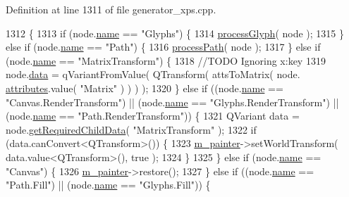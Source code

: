 Definition at line 1311 of file generator\+\_\+xps.\+cpp.


\begin{DoxyCode}
1312 \{
1313     \textcolor{keywordflow}{if} (node.\hyperlink{classXpsRenderNode_a7b3d33b9669c0235e095d5efc870ccf0}{name} == \textcolor{stringliteral}{"Glyphs"}) \{
1314         \hyperlink{classXpsHandler_a04b3024d155c9df20b3843e27014ff2c}{processGlyph}( node );
1315     \} \textcolor{keywordflow}{else} \textcolor{keywordflow}{if} (node.\hyperlink{classXpsRenderNode_a7b3d33b9669c0235e095d5efc870ccf0}{name} == \textcolor{stringliteral}{"Path"}) \{
1316         \hyperlink{classXpsHandler_a7e906e018c5e746d79a0ae796b1734a3}{processPath}( node );
1317     \} \textcolor{keywordflow}{else} \textcolor{keywordflow}{if} (node.\hyperlink{classXpsRenderNode_a7b3d33b9669c0235e095d5efc870ccf0}{name} == \textcolor{stringliteral}{"MatrixTransform"}) \{
1318         \textcolor{comment}{//TODO Ignoring x:key}
1319         node.\hyperlink{classXpsRenderNode_a1b07b9ac5eb86bec6d9f94ec5c855065}{data} = qVariantFromValue( QTransform( attsToMatrix( node.
      \hyperlink{classXpsRenderNode_a7f6fca2e06dd119e7eb20139af6c8477}{attributes}.value( \textcolor{stringliteral}{"Matrix"} ) ) ) );
1320     \} \textcolor{keywordflow}{else} \textcolor{keywordflow}{if} ((node.\hyperlink{classXpsRenderNode_a7b3d33b9669c0235e095d5efc870ccf0}{name} == \textcolor{stringliteral}{"Canvas.RenderTransform"}) || (node.\hyperlink{classXpsRenderNode_a7b3d33b9669c0235e095d5efc870ccf0}{name} == \textcolor{stringliteral}{"Glyphs.RenderTransform"}) 
      || (node.\hyperlink{classXpsRenderNode_a7b3d33b9669c0235e095d5efc870ccf0}{name} == \textcolor{stringliteral}{"Path.RenderTransform"}))  \{
1321         QVariant data = node.\hyperlink{classXpsRenderNode_a8d897b4ee08e42ca6844ce23c80beb55}{getRequiredChildData}( \textcolor{stringliteral}{"MatrixTransform"} );
1322         \textcolor{keywordflow}{if} (data.canConvert<QTransform>()) \{
1323             \hyperlink{classXpsHandler_a2db77df5312274e6f1d7e274b45c9d21}{m\_painter}->setWorldTransform( data.value<QTransform>(), \textcolor{keyword}{true} );
1324         \}
1325     \} \textcolor{keywordflow}{else} \textcolor{keywordflow}{if} (node.\hyperlink{classXpsRenderNode_a7b3d33b9669c0235e095d5efc870ccf0}{name} == \textcolor{stringliteral}{"Canvas"}) \{
1326         \hyperlink{classXpsHandler_a2db77df5312274e6f1d7e274b45c9d21}{m\_painter}->restore();
1327     \} \textcolor{keywordflow}{else} \textcolor{keywordflow}{if} ((node.\hyperlink{classXpsRenderNode_a7b3d33b9669c0235e095d5efc870ccf0}{name} == \textcolor{stringliteral}{"Path.Fill"}) || (node.\hyperlink{classXpsRenderNode_a7b3d33b9669c0235e095d5efc870ccf0}{name} == \textcolor{stringliteral}{"Glyphs.Fill"})) \{

\end{DoxyCode}
